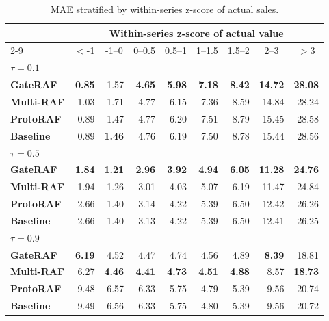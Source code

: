 \begin{table}[t]
    \caption{MAE stratified by within-series z-score of actual sales.}
    \label{tab:mae_vs_zscore}
    \centering
    \begin{tabular}{lrrrrrrrr}
    \hline
    & \multicolumn{8}{c}{Within-series z-score of actual value} \\
    \cline{2-9}
    \multicolumn{1}{c}{Model} & \multicolumn{1}{c}{$<$-1} & \multicolumn{1}{c}{-1--0} & \multicolumn{1}{c}{0--0.5} & \multicolumn{1}{c}{0.5--1} & \multicolumn{1}{c}{1--1.5} & \multicolumn{1}{c}{1.5--2} & \multicolumn{1}{c}{2--3} & \multicolumn{1}{c}{$>$3} \\
    \hline\hline
    \multicolumn{9}{l}{$\tau=0.1$} \\
    \quad \textbf{GateRAF} & \textbf{0.85} & 1.57 & \textbf{4.65} & \textbf{5.98} & \textbf{7.18} & \textbf{8.42} & \textbf{14.72} & \textbf{28.08} \\
    \quad \textbf{Multi-RAF} & 1.03 & 1.71 & 4.77 & 6.15 & 7.36 & 8.59 & 14.84 & 28.24 \\
    \quad \textbf{ProtoRAF} & 0.89 & 1.47 & 4.77 & 6.20 & 7.51 & 8.79 & 15.45 & 28.58 \\
    \quad \textbf{Baseline} & 0.89 & \textbf{1.46} & 4.76 & 6.19 & 7.50 & 8.78 & 15.44 & 28.56 \\
    \hline
    \multicolumn{9}{l}{$\tau=0.5$} \\
    \quad \textbf{GateRAF} & \textbf{1.84} & \textbf{1.21} & \textbf{2.96} & \textbf{3.92} & \textbf{4.94} & \textbf{6.05} & \textbf{11.28} & \textbf{24.76} \\
    \quad \textbf{Multi-RAF} & 1.94 & 1.26 & 3.01 & 4.03 & 5.07 & 6.19 & 11.47 & 24.84 \\
    \quad \textbf{ProtoRAF} & 2.66 & 1.40 & 3.14 & 4.22 & 5.39 & 6.50 & 12.42 & 26.26 \\
    \quad \textbf{Baseline} & 2.66 & 1.40 & 3.13 & 4.22 & 5.39 & 6.50 & 12.41 & 26.25 \\
    \hline
    \multicolumn{9}{l}{$\tau=0.9$} \\
    \quad \textbf{GateRAF} & \textbf{6.19} & 4.52 & 4.47 & 4.74 & 4.56 & 4.89 & \textbf{8.39} & 18.81 \\
    \quad \textbf{Multi-RAF} & 6.27 & \textbf{4.46} & \textbf{4.41} & \textbf{4.73} & \textbf{4.51} & \textbf{4.88} & 8.57 & \textbf{18.73} \\
    \quad \textbf{ProtoRAF} & 9.48 & 6.57 & 6.33 & 5.75 & 4.79 & 5.39 & 9.56 & 20.74 \\
    \quad \textbf{Baseline} & 9.49 & 6.56 & 6.33 & 5.75 & 4.80 & 5.39 & 9.56 & 20.72 \\
    \hline
    \end{tabular}
\end{table}

